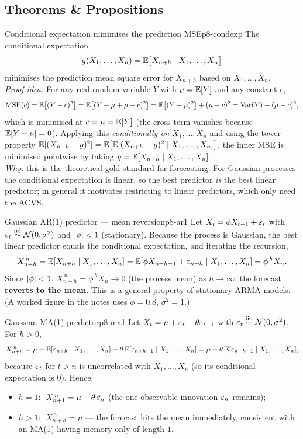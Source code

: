 \subsection{Theorems \& Propositions}

\begin{lemma}{Conditional expectation minimises the prediction MSE}{p8-condexp}
The conditional expectation
\[
g(X_1,\dots,X_n)=\mathbb{E}\big[X_{n+h}\mid X_1,\dots,X_n\big]
\]
minimises the prediction mean square error for $X_{n+h}$ based on
$X_1,\dots,X_n$.\\[3pt]
\textit{Proof idea:} For any real random variable $Y$ with $\mu=\mathbb{E}[Y]$ and any
constant $c$,
\[
\operatorname{MSE}(c)=\mathbb{E}\big[(Y-c)^2\big]=\mathbb{E}\big[(Y-\mu+\mu-c)^2\big]
=\mathbb{E}\big[(Y-\mu)^2\big]+(\mu-c)^2=\operatorname{Var}(Y)+(\mu-c)^2,
\]
which is minimised at $c=\mu=\mathbb{E}[Y]$ (the cross term vanishes because
$\mathbb{E}[Y-\mu]=0$). Applying this \emph{conditionally on} $X_1,\dots,X_n$ and using
the tower property
$\mathbb{E}[(X_{n+h}-g)^2]=\mathbb{E}\big[\mathbb{E}[(X_{n+h}-g)^2\mid X_1,\dots,X_n]\big]$, the inner
MSE is minimised pointwise by taking $g=\mathbb{E}[X_{n+h}\mid X_1,\dots,X_n]$.\\[2pt]
\textit{Why:} this is the theoretical gold standard for forecasting. For
Gaussian processes the conditional expectation is linear, so the best predictor
\emph{is} the best linear predictor; in general it motivates restricting to
linear predictors, which only need the ACVS.
\end{lemma}

\begin{example}{Gaussian AR(1) predictor --- mean reversion}{p8-ar1}
Let $X_t=\phi X_{t-1}+\varepsilon_t$ with $\varepsilon_t\overset{\text{iid}}{\sim}\mathcal N(0,\sigma^2)$ and
$\left\lvert \phi \right\rvert<1$ (stationary). Because the process is Gaussian, the best linear
predictor equals the conditional expectation, and iterating the recursion,
\[
X^{\,n}_{n+h}=\mathbb{E}[X_{n+h}\mid X_1,\dots,X_n]
=\mathbb{E}[\phi X_{n+h-1}+\varepsilon_{n+h}\mid X_1,\dots,X_n]
=\phi^{\,h}X_n .
\]
Since $\left\lvert \phi \right\rvert<1$, $X^{\,n}_{n+h}=\phi^{\,h}X_n\to0$ (the process mean) as
$h\to\infty$: the forecast \textbf{reverts to the mean}. This is a general
property of stationary ARMA models. (A worked figure in the notes uses
$\phi=0.8$, $\sigma^2=1$.)
\end{example}

\begin{example}{Gaussian MA(1) predictor}{p8-ma1}
Let $X_t=\mu+\varepsilon_t-\theta\varepsilon_{t-1}$ with $\varepsilon_t\overset{\text{iid}}{\sim}\mathcal N(0,\sigma^2)$.
For $h>0$,
\[
X^{\,n}_{n+h}=\mu+\mathbb{E}[\varepsilon_{n+h}\mid X_1,\dots,X_n]-\theta\,\mathbb{E}[\varepsilon_{n+h-1}\mid X_1,\dots,X_n]
=\mu-\theta\,\mathbb{E}[\varepsilon_{n+h-1}\mid X_1,\dots,X_n],
\]
because $\varepsilon_t$ for $t>n$ is uncorrelated with $X_1,\dots,X_n$ (so its
conditional expectation is $0$). Hence:
\begin{itemize}
  \item $h=1$: $\;X^{\,n}_{n+1}=\mu-\theta\,\hat{\varepsilon}_n$ (the one observable
        innovation $\varepsilon_n$ remains);
  \item $h>1$: $\;X^{\,n}_{n+h}=\mu$ --- the forecast hits the mean immediately,
        consistent with an MA(1) having memory only of length $1$.
\end{itemize}
\end{example}

